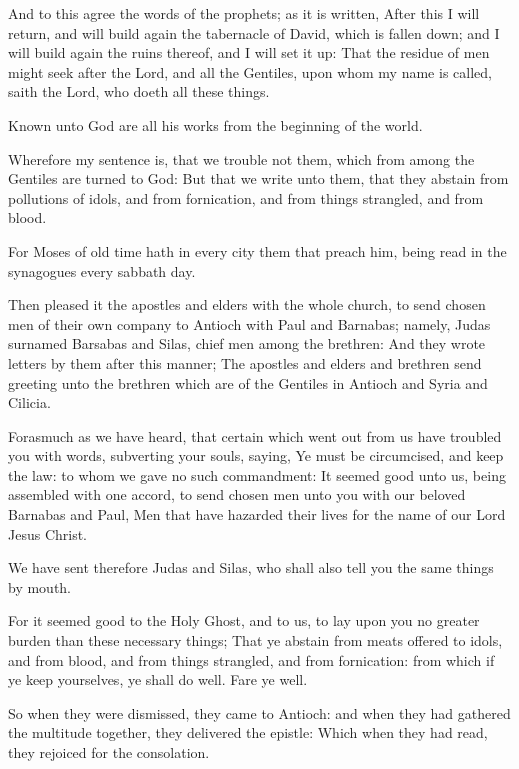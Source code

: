 \Verse And to this agree the words of the prophets; as it is written, \Verse After this I will return, and will build again the tabernacle of David, which is fallen down; and I will build again the ruins thereof, and I will set it up: \Verse That the residue of men might seek after the Lord, and all the Gentiles, upon whom my name is called, saith the Lord, who doeth all these things.

\Verse Known unto God are all his works from the beginning of the world.

\Verse Wherefore my sentence is, that we trouble not them, which from among the Gentiles are turned to God: \Verse But that we write unto them, that they abstain from pollutions of idols, and from fornication, and from things strangled, and from blood.

\Verse For Moses of old time hath in every city them that preach him, being read in the synagogues every sabbath day.

\Verse Then pleased it the apostles and elders with the whole church, to send chosen men of their own company to Antioch with Paul and Barnabas; namely, Judas surnamed Barsabas and Silas, chief men among the brethren: \Verse And they wrote letters by them after this manner; The apostles and elders and brethren send greeting unto the brethren which are of the Gentiles in Antioch and Syria and Cilicia.

\Verse Forasmuch as we have heard, that certain which went out from us have troubled you with words, subverting your souls, saying, Ye must be circumcised, and keep the law: to whom we gave no such commandment: \Verse It seemed good unto us, being assembled with one accord, to send chosen men unto you with our beloved Barnabas and Paul, \Verse Men that have hazarded their lives for the name of our Lord Jesus Christ.

\Verse We have sent therefore Judas and Silas, who shall also tell you the same things by mouth.

\Verse For it seemed good to the Holy Ghost, and to us, to lay upon you no greater burden than these necessary things; \Verse That ye abstain from meats offered to idols, and from blood, and from things strangled, and from fornication: from which if ye keep yourselves, ye shall do well. Fare ye well.

\Verse So when they were dismissed, they came to Antioch: and when they had gathered the multitude together, they delivered the epistle: \Verse Which when they had read, they rejoiced for the consolation.

